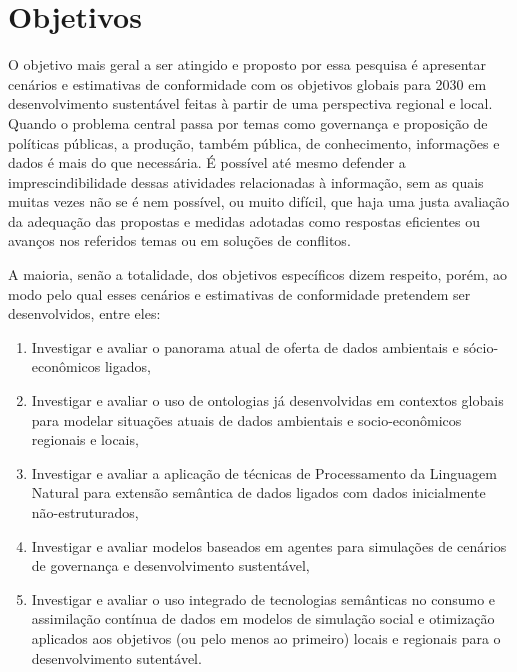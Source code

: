 \documentclass[
	12pt,				%
	openany,			%
	oneside,			%
	a4paper,			%
	english,			%
	french,				%
	spanish,			%
	brazil,				%
	]{abntex2}
\begin{document}
\chapter{Objetivos}



O objetivo mais geral a ser atingido e proposto por essa pesquisa é apresentar cenários e estimativas de conformidade \cite{patterson_exploring_2016} com os objetivos globais para 2030 em desenvolvimento sustentável \cite{united_nations_transforming_2015} feitas à partir de uma perspectiva regional e local. Quando o problema central passa por temas como governança e proposição de políticas públicas, a produção, também pública, de conhecimento, informações e dados é mais do que necessária. É possível até mesmo defender a imprescindibilidade dessas atividades relacionadas à informação, sem as quais muitas vezes não se é nem possível, ou muito difícil, que haja uma justa avaliação da adequação das propostas e medidas adotadas como respostas eficientes ou avanços nos referidos temas ou em soluções de conflitos.


A maioria, senão a totalidade, dos objetivos específicos dizem respeito, porém, ao modo pelo qual esses cenários e estimativas de conformidade pretendem ser desenvolvidos, entre eles:

\begin{enumerate}
	\item Investigar e avaliar o panorama atual de oferta de dados ambientais e sócio-econômicos ligados,
	\item Investigar e avaliar o uso de ontologias já desenvolvidas em contextos globais para modelar situações atuais de dados ambientais e socio-econômicos regionais e locais,
	\item Investigar e avaliar a aplicação de técnicas de Processamento da Linguagem Natural para extensão semântica de dados ligados com dados inicialmente não-estruturados,
	\item Investigar e avaliar modelos baseados em agentes para simulações de cenários de governança e desenvolvimento sustentável,
	\item Investigar e avaliar o uso integrado de tecnologias semânticas no consumo e assimilação contínua de dados em modelos de simulação social e otimização aplicados aos objetivos (ou pelo menos ao primeiro) locais e regionais para o desenvolvimento sutentável.
\end{enumerate}
\end{document}
